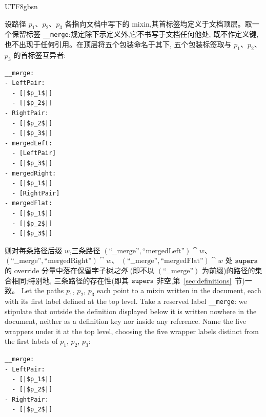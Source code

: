 \begin{CJK*}{UTF8}{gbsn}
\begin{theorem}\label{thm:merge-associative}
  \ifPaperChinese
  设路径 $p_1$、$p_2$、$p_3$ 各指向文档中写下的 mixin,其首标签均定义于文档顶层。取一个保留标签
  \texttt{__merge}:规定除下示定义外,它不书写于文档任何他处,
  既不作定义键,也不出现于任何引用。在顶层将五个包装命名于其下,
  五个包装标签取与 $p_1$、$p_2$、$p_3$ 的首标签互异者:
  \begin{verbatim}
__merge:
- LeftPair:
  - [|$p_1$|]
  - [|$p_2$|]
- RightPair:
  - [|$p_2$|]
  - [|$p_3$|]
- mergedLeft:
  - [LeftPair]
  - [|$p_3$|]
- mergedRight:
  - [|$p_1$|]
  - [RightPair]
- mergedFlat:
  - [|$p_1$|]
  - [|$p_2$|]
  - [|$p_3$|]
  \end{verbatim}
  则对每条路径后缀 $w$,三条路径
  $(\text{``\_\_merge''}, \text{``mergedLeft''}) \cat w$、
  $(\text{``\_\_merge''}, \text{``mergedRight''}) \cat w$、
  $(\text{``\_\_merge''}, \text{``mergedFlat''}) \cat w$ 处
  $\mathtt{supers}$ 的 override 分量中落在保留字子树\emph{之外}
  (即不以 $(\text{``\_\_merge''})$ 为前缀)的路径的集合相同;特别地,
  三条路径的存在性(即其 $\mathtt{supers}$ 非空,第~\ref{sec:definitions}~节)一致。
  \else
  Let the paths $p_1$, $p_2$, $p_3$ each point to a mixin written in
  the document, each with its first label defined
  at the top level. Take a reserved label \texttt{__merge}:
  we stipulate that outside the definition displayed below it is
  written nowhere in the document, neither as a definition key nor
  inside any reference. Name the five wrappers under it at the
  top level, choosing the five wrapper labels distinct from the
  first labels of $p_1$, $p_2$, $p_3$:
  \begin{verbatim}
__merge:
- LeftPair:
  - [|$p_1$|]
  - [|$p_2$|]
- RightPair:
  - [|$p_2$|]

\end{verbatim}
\end{theorem}
\end{CJK*}

